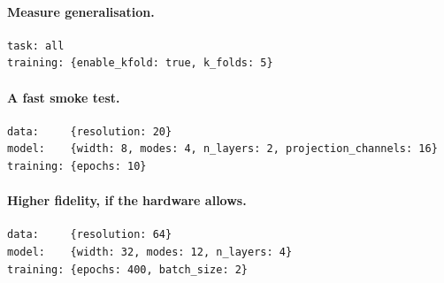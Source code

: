 \paragraph{Measure generalisation.}
\begin{lstlisting}
task: all
training: {enable_kfold: true, k_folds: 5}
\end{lstlisting}

\paragraph{A fast smoke test.}
\begin{lstlisting}
data:     {resolution: 20}
model:    {width: 8, modes: 4, n_layers: 2, projection_channels: 16}
training: {epochs: 10}
\end{lstlisting}

\paragraph{Higher fidelity, if the hardware allows.}
\begin{lstlisting}
data:     {resolution: 64}
model:    {width: 32, modes: 12, n_layers: 4}
training: {epochs: 400, batch_size: 2}
\end{lstlisting}
